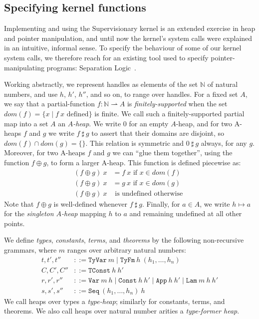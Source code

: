 \documentclass[a4paper, UKenglish, cleveref, autoref, thm-restate, colorlinks]{lipics-v2021}
\begin{document}
\subsection{Specifying kernel functions}
\label{subsect.specifying.kernel.functions}

Implementing and using the Supervisionary kernel is an extended exercise in heap and pointer manipulation, and until now the kernel's system calls were explained in an intuitive, informal sense.
To specify the behaviour of some of our kernel system calls, we therefore reach for an existing tool used to specify pointer-manipulating programs: Separation Logic~\cite{DBLP:conf/lics/Reynolds02, DBLP:conf/popl/IshtiaqO01}.

Working abstractly, we represent handles as elements of the set $\mathbb{N}$ of natural numbers, and use $h$, $h'$, $h''$, and so on, to range over handles.
For a fixed set $A$, we say that a partial-function $f : \mathbb{N} \rightharpoonup A$ is \emph{finitely-supported} when the set $dom(f) = \{ x \mid f\ x \text{ defined} \}$ is finite.
We call such a finitely-supported partial map into a set $A$ an \emph{$A$-heap}.
We write $0$ for an empty $A$-heap, and for two A-heaps $f$ and $g$ we write $f\ \sharp\ g$ to assert that their domains are disjoint, so $dom(f) \cap dom(g) = \{ \}$.
This relation is symmetric and $0\ \sharp\ g$ always, for any $g$.
Moreover, for two A-heaps $f$ and $g$ we can ``glue them together'', using the function $f \oplus g$, to form a larger A-heap.
This function is defined piecewise as:
\begin{align*}
(f \oplus g)\ x & = f\ x \text{ if $x \in dom(f)$ } \\
(f \oplus g)\ x & = g\ x \text{ if $x \in dom(g)$ } \\
(f \oplus g)\ x & \text{ is undefined otherwise }
\end{align*}
Note that $f \oplus g$ is well-defined whenever $f\ \sharp\ g$.
Finally, for $a \in A$, we write $h \mapsto a$ for the \emph{singleton $A$-heap} mapping $h$ to $a$ and remaining undefined at all other points.

We define \emph{types}, \emph{constants}, \emph{terms}, and \emph{theorems} by the following non-recursive grammars, where $m$ ranges over arbitrary natural numbers:
\begin{align*}
t, t', t'' &::= \mathtt{TyVar}\ m \mid \mathtt{TyFm}\ h\ (h_1, \ldots, h_n) \\
C, C', C'' &::= \mathtt{TConst}\ h\ h' \\
r, r', r'' &::= \mathtt{Var}\ m\ h \mid \mathtt{Const}\ h\ h' \mid \mathtt{App}\ h\ h' \mid \mathtt{Lam}\ m\ h\ h' \\
s, s', s'' &::= \mathtt{Seq}\ (h_1, \ldots, h_n)\ h
\end{align*}
We call heaps over types a \emph{type-heap}; similarly for constants, terms, and theorems.
We also call heaps over natural number arities a \emph{type-former heap}.
\end{document}
